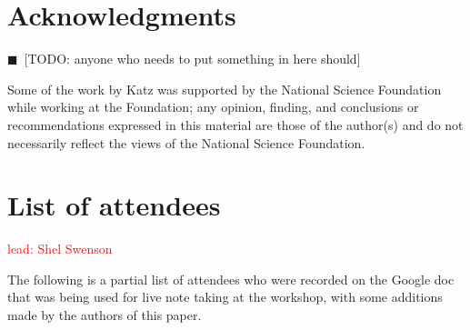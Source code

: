 \documentclass[11pt, oneside]{amsart}
\newcommand{\todo}[1]{{\color{blue}$\blacksquare$~\textsf{[TODO: #1]}}}
\newcommand{\note}[1]{ {\textcolor{red}    { #1 }}}
\begin{document}
\section*{Acknowledgments}

\todo{anyone who needs to put something in here should}

Some of the work by Katz was
supported by the National Science Foundation while working at the
Foundation; any opinion, finding, and conclusions or recommendations
expressed in this material are those of the author(s) and do not
necessarily reflect the views of the National Science Foundation.


\appendix
\section{List of attendees}

\note{lead: Shel Swenson}

The following is a partial list of attendees who were recorded on the
Google doc~\cite{WSSSPE1-google-notes} that was being used for live note taking at the workshop, with some additions made by the authors of this paper.
\end{document}
